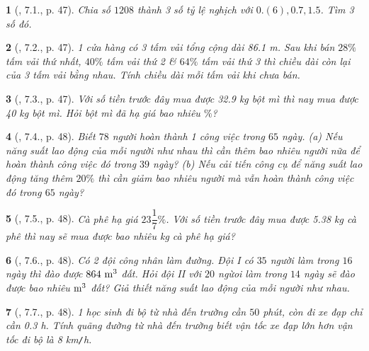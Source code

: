\documentclass{article}
\newtheorem{baitoan}{}
\begin{document}
\begin{baitoan}[\cite{Binh_boi_duong_Toan_7_tap_1}, 7.1., p. 47]
	Chia số $1208$ thành 3 số tỷ lệ nghịch với $0.(6),0.7,1.5$. Tìm 3 số đó.
\end{baitoan}

\begin{baitoan}[\cite{Binh_boi_duong_Toan_7_tap_1}, 7.2., p. 47]
	1 cửa hàng có 3 tấm vải tổng cộng dài {\rm86.1 m}. Sau khi bán $28\%$ tấm vải thứ nhất, $40\%$ tấm vải thứ 2 \& $64\%$ tấm vải thứ 3 thì chiều dài còn lại của 3 tấm vải bằng nhau. Tính chiều dài mỗi tấm vải khi chưa bán.
\end{baitoan}

\begin{baitoan}[\cite{Binh_boi_duong_Toan_7_tap_1}, 7.3., p. 47]
	Với số tiền trước đây mua được {\rm32.9 kg} bột mì thì nay mua được {\rm40 kg} bột mì. Hỏi bột mì đã hạ giá bao nhiêu $\%$?
\end{baitoan}

\begin{baitoan}[\cite{Binh_boi_duong_Toan_7_tap_1}, 7.4., p. 48]
	Biết $78$ người hoàn thành 1 công việc trong $65$ ngày. (a) Nếu năng suất lao động của mỗi người như nhau thì cần thêm bao nhiêu người nữa để hoàn thành công việc đó trong $39$ ngày? (b) Nếu cải tiến công cụ để năng suất lao động tăng thêm $20\%$ thì cần giảm bao nhiêu người mà vẫn hoàn thành công việc đó trong $65$ ngày?
\end{baitoan}

\begin{baitoan}[\cite{Binh_boi_duong_Toan_7_tap_1}, 7.5., p. 48]
	Cà phê hạ giá $23\dfrac{1}{7}\%$. Với số tiền trước đây mua được {\rm5.38 kg} cà phê thì nay sẽ mua được bao nhiêu {\rm kg} cà phê hạ giá?
\end{baitoan}

\begin{baitoan}[\cite{Binh_boi_duong_Toan_7_tap_1}, 7.6., p. 48]
	Có 2 đội công nhân làm đường. Đội I có $35$ người làm trong $16$ ngày thì đào được $\rm864\ m^3$ đất. Hỏi đội II với $20$ ngừoi làm trong $14$ ngày sẽ đào được bao nhiêu $\rm m^3$ đất? Giả thiết năng suất lao động của mỗi người như nhau.
\end{baitoan}

\begin{baitoan}[\cite{Binh_boi_duong_Toan_7_tap_1}, 7.7., p. 48]
	1 học sinh đi bộ từ nhà đến trường cần $50$ phút, còn đi xe đạp chỉ cần {\rm0.3 h}. Tính quãng đường từ nhà đến trường biết vận tốc xe đạp lớn hơn vận tốc đi bộ là {\rm8 km{\tt/}h}.
\end{baitoan}
\end{document}
